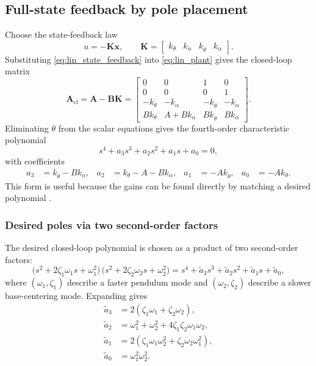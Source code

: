\subsection{Full-state feedback by pole placement}
Choose the state-feedback law
\begin{equation}
u = -\mathbf{K}\mathbf{x},\qquad
\mathbf{K}=\begin{bmatrix}k_\theta & k_\alpha & k_{\dot{\theta}} & k_{\dot{\alpha}}\end{bmatrix}.
\label{eq:lin_state_feedback}
\end{equation}
Substituting \eqref{eq:lin_state_feedback} into \eqref{eq:lin_plant} gives the closed-loop matrix
\[
\mathbf{A}_{\mathrm{cl}}=\mathbf{A}-\mathbf{B}\mathbf{K}
=
\begin{bmatrix}
0 & 0 & 1 & 0\\
0 & 0 & 0 & 1\\
-k_\theta & -k_\alpha & -k_{\dot{\theta}} & -k_{\dot{\alpha}}\\
B k_\theta & A + B k_\alpha & B k_{\dot{\theta}} & B k_{\dot{\alpha}}
\end{bmatrix}.
\]
Eliminating $\theta$ from the scalar equations gives the fourth-order characteristic polynomial
\begin{equation}
s^4 + a_3 s^3 + a_2 s^2 + a_1 s + a_0 = 0,
\label{eq:lin_charpoly}
\end{equation}
with coefficients
\begin{align}
a_3 &= k_{\dot{\theta}} - B k_{\dot{\alpha}}, &
a_2 &= k_{\theta} - A - B k_{\alpha}, &
a_1 &= -A k_{\dot{\theta}}, &
a_0 &= -A k_{\theta}.
\label{eq:lin_coeffs}
\end{align}
This form is useful because the gains can be found directly by matching a desired polynomial \cite{ogata_modern_control}.

\subsubsection{Desired poles via two second-order factors}
The desired closed-loop polynomial is chosen as a product of two second-order factors:
\begin{equation}
\bigl(s^2+2\zeta_1\omega_1 s+\omega_1^2\bigr)\,
\bigl(s^2+2\zeta_2\omega_2 s+\omega_2^2\bigr)
= s^4 + \tilde a_3 s^3 + \tilde a_2 s^2 + \tilde a_1 s + \tilde a_0,
\label{eq:lin_desired_poly}
\end{equation}
where $(\omega_1,\zeta_1)$ describe a faster pendulum mode and $(\omega_2,\zeta_2)$ describe a slower base-centering mode. Expanding gives
\begin{align}
\tilde a_3 &= 2(\zeta_1\omega_1+\zeta_2\omega_2),\nonumber\\
\tilde a_2 &= \omega_1^2+\omega_2^2+4\zeta_1\zeta_2\omega_1\omega_2,\nonumber\\
\tilde a_1 &= 2(\zeta_1\omega_1\omega_2^2+\zeta_2\omega_2\omega_1^2),\nonumber\\
\tilde a_0 &= \omega_1^2\omega_2^2.
\label{eq:lin_desired_coeffs}
\end{align}


